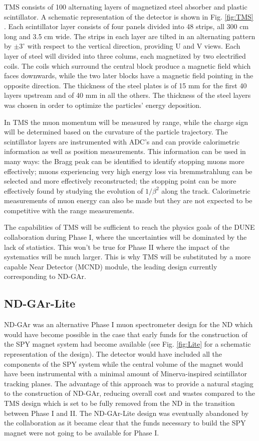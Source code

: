 TMS consists of 100 alternating layers of magnetized steel absorber and plastic scintillator. A schematic representation of the detector is shown in Fig. \ref{fig:TMS} . Each scintillator layer consists of four panels divided into 48 strips, all 300 cm long and 3.5 cm wide. The strips in each layer are tilted in an alternating pattern by $\pm 3^\circ$ with respect to the vertical direction, providing U and V views. Each layer of steel will divided into three colums, each magnetized by two electrified coils. The coils which surround the central block produce a magnetic field which faces downwards, while the two later blocks have a magnetic field pointing  in the opposite direction. The thickness of the steel plates is of 15 mm for the first 40 layers upstream and of 40 mm in all the others. The thickness of the steel layers was chosen in order to optimize the particles' energy deposition.

In TMS the muon momentum will be measured by range, while the charge sign will be determined based on the curvature of the particle trajectory. The scintillator layers are instrumented with ADC's and can provide calorimetric information as well as position measurements. This information can be used in many ways: the Bragg peak can be identified to identify stopping muons more effectively; muons experiencing very high energy loss via bremmstrahlung can be selected and more effectively reconstructed; the stopping point can be more effectively found by studying the evolution of $1/\beta^2$ along the track. Calorimetric measurements of muon energy can also be made but they are not expected to be competitive with the range measurements. 

The capabilities of TMS will be sufficient to reach the physics goals of the DUNE collaboration during Phase I, where the uncertainties will be dominated by the lack of statistics. This won't be true for Phase II where the impact of the systematics will be much larger. This is why TMS will be substituted by a more capable Near Detector (MCND) module, the leading design currently corresponding to ND-GAr. 

\subsection{ND-GAr-Lite}
\label{Sec: DUNE-GArLite}

ND-GAr was an alternative Phase I muon spectrometer design for the ND which would have become possible in the case that early funds for the construction of the SPY magnet system had become available (see Fig. \ref{fig:Lite} for a schematic representation of the design). The detector would have included all the components of the SPY system while the central volume of the magnet would have been instrumental with a minimal amount of Minerva-inspired scintillator tracking planes. The advantage of this approach was to provide a natural staging to the construction of ND-GAr, reducing overall cost and wastes compared to the TMS design which is set to be fully removed from the ND in the transition between Phase I and II. The ND-GAr-Lite design was eventually abandoned by the collaboration as it became clear that the funds necessary to build the SPY magnet were not going to be available for Phase I. 


